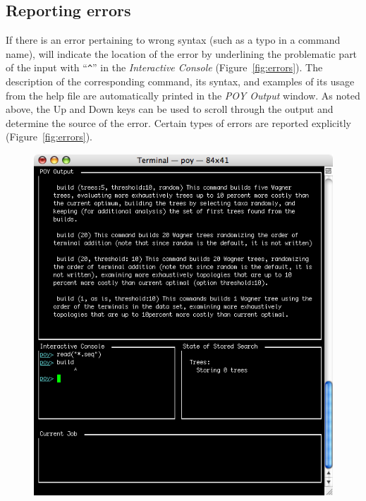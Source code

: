 \subsection{Reporting errors}
If there is an error pertaining to wrong syntax (such as a typo in a command name), \poy will indicate the location of the error by underlining the problematic part of the input with ``\texttt{\^}'' in the \emph{Interactive Console} (Figure~\ref{fig:errors}). The description of the corresponding command, its syntax, and examples of its usage from the help file are automatically printed in the \emph{POY Output} window. As noted above, the Up and Down keys can be used to scroll through the output and determine the source of the error. Certain types of errors are reported explicitly (Figure~\ref{fig:errors}).

\begin{figure}
\centering
\begin{minipage}[c]{0.48\textwidth}
   		\includegraphics[width=\textwidth]{doc/figures/figerror1.jpg}
\end{minipage}%
\quad
\begin{minipage}[c]{0.48\textwidth}

\end{minipage}
\end{figure}
